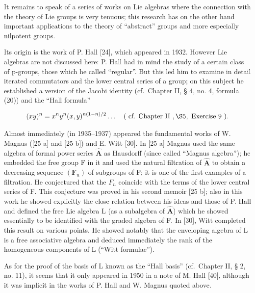 It remains to speak of a series of works on Lie algebras where the connection with the theory of Lie groups is very tenuous; this research has on the other hand important applications to the theory of ``abstract'' groups and more especially nilpotent groups.

Its origin is the work of P. Hall {[}24{]}, which appeared in 1932. However Lie algebras are not discussed here: P. Hall had in mind the study of a certain class of p-groups, those which he called ``regular''. But this led him to examine in detail iterated commutators and the lower central series of a group; on this subject he established a version of the Jacobi identity (cf.~Chapter II, § 4, no. 4, formula (20)) and the ``Hall formula''

\[
(x y) ^ {n} = x ^ {n} y ^ {n} (x, y) ^ {n (1 - n) / 2} \dots \quad (\text { cf.   Chapter   II }, \S 5, \text { Exercise   9 }).
\]

Almost immediately (in 1935--1937) appeared the fundamental works of W. Magnus ({[}25 a{]} and {[}25 b{]}) and E. Witt {[}30{]}. In {[}25 a{]} Magnus used the same algebra of formal power series \(\hat{\mathbf{A}}\) as Hausdorff (since called ``Magnus algebra''); he embedded the free group F in it and used the natural filtration of \(\hat{\mathbf{A}}\) to obtain a decreasing sequence \((\mathbf{F}_{n})\) of subgroups of F; it is one of the first examples of a filtration. He conjectured that the \(F_{n}\) coincide with the terms of the lower central series of F. This conjecture was proved in his second memoir {[}25 b{]}; also in this work he showed explicitly the close relation between his ideas and those of P. Hall and defined the free Lie algebra L (as a subalgebra of \(\hat{\mathbf{A}}\)) which he showed essentially to be identified with the graded algebra of F. In {[}30{]}, Witt completed this result on various points. He showed notably that the enveloping algebra of L is a free associative algebra and deduced immediately the rank of the homogeneous components of L (``Witt formulae'').

As for the proof of the basis of L known as the ``Hall basis'' (cf.~Chapter II, § 2, no. 11), it seems that it only appeared in 1950 in a note of M. Hall {[}40{]}, although it was implicit in the works of P. Hall and W. Magnus quoted above.



